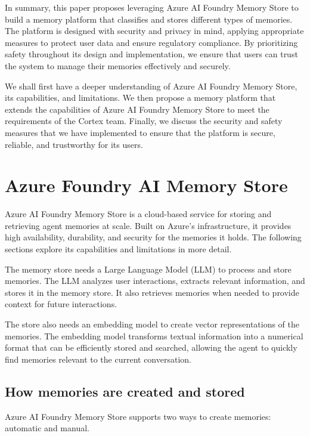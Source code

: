 \documentclass[9pt]{extarticle}%
\begin{document}
%
\par\vspace{\baselineskip}%
In summary, this paper proposes leveraging Azure AI Foundry Memory Store to build a memory platform that classifies and stores different types of memories. The platform is designed with security and privacy in mind, applying appropriate measures to protect user data and ensure regulatory compliance. By prioritizing safety throughout its design and implementation, we ensure that users can trust the system to manage their memories effectively and securely.
%
\par\vspace{\baselineskip}%
We shall first have a deeper understanding of Azure AI Foundry Memory Store, its capabilities, and limitations. We then propose a memory platform that extends the capabilities of Azure AI Foundry Memory Store to meet the requirements of the Cortex team. Finally, we discuss the security and safety measures that we have implemented to ensure that the platform is secure, reliable, and trustworthy for its users.
%
\par\vspace{\baselineskip}%
\section{Azure Foundry AI Memory Store}%
Azure AI Foundry Memory Store is a cloud-based service for storing and retrieving agent memories at scale. Built on Azure's infrastructure, it provides high availability, durability, and security for the memories it holds. The following sections explore its capabilities and limitations in more detail.
%
\par\vspace{\baselineskip}%
The memory store needs a Large Language Model (LLM) to process and store memories. The LLM analyzes user interactions, extracts relevant information, and stores it in the memory store. It also retrieves memories when needed to provide context for future interactions.
%
\par\vspace{\baselineskip}%
The store also needs an embedding model to create vector representations of the memories. The embedding model transforms textual information into a numerical format that can be efficiently stored and searched, allowing the agent to quickly find memories relevant to the current conversation.
%
\par\vspace{\baselineskip}%
\subsection{How memories are created and stored}%
Azure AI Foundry Memory Store supports two ways to create memories: automatic and manual.
%
\par\vspace{\baselineskip}%
\end{document}
